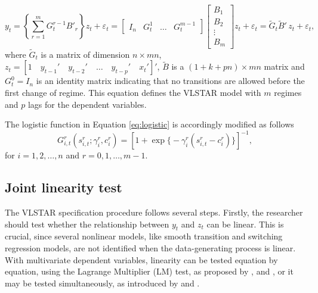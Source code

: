 \begin{equation}
\label{eq:VLSTAR1}
y_t=\left\{\sum_{r=1}^m G_t^{r-1}B'_r\right\}z_t+\varepsilon_t=
\begin{bmatrix}I_{n} & G_t^1 & \ldots & G_t^{m-1}\end{bmatrix}
\begin{bmatrix}B_1\\B_2\\\vdots\\B_m\end{bmatrix}z_t+\varepsilon_t=\tilde{G}_t \tilde{B}'\,z_t+\varepsilon_t,
\end{equation}
where $\tilde{G}_t$ is a matrix of dimension $n\times m n$, $z_t=\left[1\quad y_{t-1}'\quad y_{t-2}' \quad\ldots\quad y_{t-p}'\quad x_t'\right]'$, $\tilde{B}$ is a $\left(1+k+p n\right)\times m n$ matrix and
$G_t^0=I_{n}$ is an identity matrix indicating that no transitions are allowed before the first change of regime. This equation defines the VLSTAR model with $m$ regimes and $p$ lags for the dependent variables.

The logistic function in Equation \eqref{eq:logistic} is accordingly modified as follows
\begin{equation}
\label{eq:transition}
G_{i,t}^r\left(s_{i,t}^r; \gamma_i^r, c_i^r\right) = \left[1 + \exp\big\{-\gamma_i^r(s_{i,t}^r-c_i^r)\big\}\right]^{-1},
\end{equation}
for $i = 1,2, \dots, n$ and $r=0,1,\dots,m-1$.



\subsection{Joint linearity test} \label{joint}

The VLSTAR specification procedure follows several steps. Firstly, the researcher should test whether the relationship between $y_t$ and $z_t$ can be linear. This is crucial, since several nonlinear models, like smooth transition and switching regression models, are not identified when the data-generating process is linear. With multivariate dependent variables, linearity can be tested equation by equation, using the Lagrange Multiplier (LM) test, as proposed by \citet*{lusate88}, \citet*{tera94} and \citet*{tetjg10}, or it may be tested simultaneously, as introduced by \citet{hute13} and \citet{teraya14b}.


